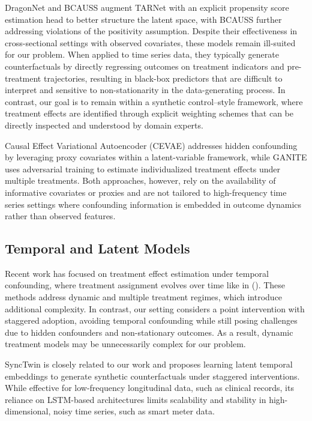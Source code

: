 \documentclass[10pt]{article} %
\begin{document}
DragonNet \citep{dragonnet} and BCAUSS \citep{bcauss} augment TARNet with an explicit propensity score estimation head to better structure the latent space, with BCAUSS further addressing violations of the positivity assumption. Despite their effectiveness in cross-sectional settings with observed covariates, these models remain ill-suited for our problem. When applied to time series data, they typically generate counterfactuals by directly regressing outcomes on treatment indicators and pre-treatment trajectories, resulting in black-box predictors that are difficult to interpret and sensitive to non-stationarity in the data-generating process. In contrast, our goal is to remain within a synthetic control–style framework, where treatment effects are identified through explicit weighting schemes that can be directly inspected and understood by domain experts.

Causal Effect Variational Autoencoder (CEVAE) \citep{cevae} addresses hidden confounding by leveraging proxy covariates within a latent-variable framework, while GANITE \citep{ganite} uses adversarial training to estimate individualized treatment effects under multiple treatments. Both approaches, however, rely on the availability of informative covariates or proxies and are not tailored to high-frequency time series settings where confounding information is embedded in outcome dynamics rather than observed features.

\subsection{Temporal and Latent Models}
Recent work has focused on treatment effect estimation under temporal confounding, where treatment assignment evolves over time like in
(\citealt{bica2020time, liu2020estimating, cao2023estimating}).
These methods address dynamic and multiple treatment regimes, which introduce additional complexity. In contrast, our setting considers a point intervention with staggered adoption, avoiding temporal confounding while still posing challenges due to hidden confounders and non-stationary outcomes. As a result, dynamic treatment models may be unnecessarily complex for our problem.

SyncTwin \citep{synctwin} is closely related to our work and proposes learning latent temporal embeddings to generate synthetic counterfactuals under staggered interventions. While effective for low-frequency longitudinal data, such as clinical records, its reliance on LSTM-based architectures limits scalability and stability in high-dimensional, noisy time series, such as smart meter data.
\end{document}
